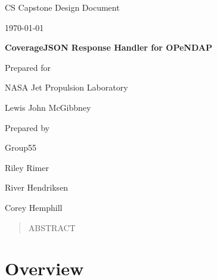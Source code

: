 \documentclass[onecolumn, draftclsnofoot,10pt, compsoc]{IEEEtran}
\def \CapstoneTeamNumber{55}
\def \GroupMemberOne{Riley Rimer}
\def \GroupMemberTwo{River Hendriksen}
\def \GroupMemberThree{Corey Hemphill}
\def \CapstoneProjectName{CoverageJSON Response Handler for OPeNDAP}
\def \CapstoneSponsorCompany{NASA Jet Propulsion Laboratory}
\def \CapstoneSponsorPerson{Lewis John McGibbney}
\def \DocType{	%
				Design Document
				}
\newcommand{\NameSigPair}[1]{\par
\makebox[2.75in][r]{#1} \hfil 	\makebox[3.25in]{\makebox[2.25in]{\hrulefill} \hfill		\makebox[.75in]{\hrulefill}}
\par\vspace{-12pt} \textit{\tiny\noindent
\makebox[2.75in]{} \hfil	\makebox[3.25in]{\makebox[2.25in][r]{Signature} \hfill	\makebox[.75in][r]{Date}}}}
\renewcommand{\NameSigPair}[1]{#1}
\begin{document}
\begin{titlepage}
    \begin{singlespace}
        \hfill    
        \par\vspace{.2in}
        \centering
        \scshape{
            \huge CS Capstone \DocType \par
            {\large\today}\par
            \vspace{.5in}
            \textbf{\Huge\CapstoneProjectName}\par
                        \vspace{.5in}

            \vfill
            {\large Prepared for}\par
            \Huge \CapstoneSponsorCompany\par
            \vspace{5pt}
            {\Large\NameSigPair{\CapstoneSponsorPerson}\par}
            {\large Prepared by }\par
            Group\CapstoneTeamNumber\par
            \vspace{5pt}
            {\Large
                \NameSigPair{\GroupMemberOne}\par
                \NameSigPair{\GroupMemberTwo}\par
                \NameSigPair{\GroupMemberThree}\par
            }
            \vspace{20pt}
        }
        \begin{abstract}
        	ABSTRACT 
        \end{abstract}     
    \end{singlespace}
\end{titlepage}
\newpage
{}
\tableofcontents
\clearpage
\section{Overview}
\end{document}
